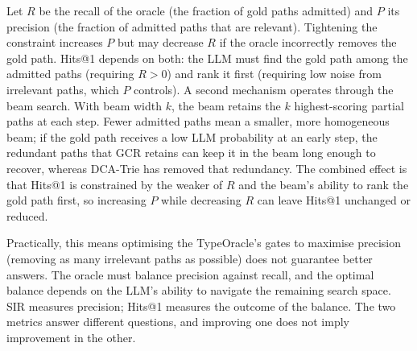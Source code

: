 Let $R$ be the recall of the oracle (the fraction of gold paths admitted) and $P$ its
precision (the fraction of admitted paths that are relevant). Tightening the constraint
increases $P$ but may decrease $R$ if the oracle incorrectly removes the gold path.
Hits@1 depends on both: the LLM must find the gold path among the admitted paths
(requiring $R > 0$) and rank it first (requiring low noise from irrelevant paths,
which $P$ controls). A second mechanism operates through the beam search. With beam
width $k$, the beam retains the $k$ highest-scoring partial paths at each step. Fewer
admitted paths mean a smaller, more homogeneous beam; if the gold path receives a low
LLM probability at an early step, the redundant paths that GCR retains can keep it in
the beam long enough to recover, whereas DCA-Trie has removed that redundancy. The
combined effect is that Hits@1 is constrained by the weaker of $R$ and the beam's
ability to rank the gold path first, so increasing $P$ while decreasing $R$ can leave
Hits@1 unchanged or reduced.

Practically, this means optimising the TypeOracle's gates to maximise precision
(removing as many irrelevant paths as possible) does not guarantee better answers. The
oracle must balance precision against recall, and the optimal balance depends on the
LLM's ability to navigate the remaining search space. SIR measures precision; Hits@1
measures the outcome of the balance. The two metrics answer different questions, and
improving one does not imply improvement in the other.